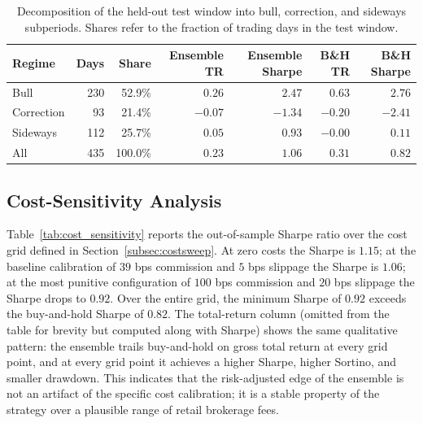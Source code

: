 \documentclass{ieeeaccess}
\newcommand{\BHsharpe}{\ensuremath{0.82}}
\newcommand{\CostZeroSharpe}{\ensuremath{1.15}}
\newcommand{\CostBaseSharpe}{\ensuremath{1.06}}
\newcommand{\CostWorstSharpe}{\ensuremath{0.92}}
\newcommand{\CostMinSharpe}{\ensuremath{0.92}}
\begin{document}
\begin{table}[t]
\centering
\caption{Decomposition of the held-out test window into bull, correction, and sideways subperiods. Shares refer to the fraction of trading days in the test window.}
\label{tab:regime}
\begin{tabular}{lrrrrrr}
\toprule
Regime & Days & Share & Ensemble TR & Ensemble Sharpe & B\&H TR & B\&H Sharpe \\
\midrule
Bull & 230 & 52.9\% & $0.26$ & $2.47$ & $0.63$ & $2.76$ \\
Correction & 93 & 21.4\% & $-0.07$ & $-1.34$ & $-0.20$ & $-2.41$ \\
Sideways & 112 & 25.7\% & $0.05$ & $0.93$ & $-0.00$ & $0.11$ \\
All & 435 & 100.0\% & $0.23$ & $1.06$ & $0.31$ & $0.82$ \\
\bottomrule
\end{tabular}
\end{table}

\subsection{Cost-Sensitivity Analysis}
\label{subsec:cost_sensitivity}

Table~\ref{tab:cost_sensitivity} reports the out-of-sample Sharpe ratio over the cost grid defined in Section~\ref{subsec:costsweep}. At zero costs the Sharpe is \CostZeroSharpe{}; at the baseline calibration of $39$ bps commission and $5$ bps slippage the Sharpe is \CostBaseSharpe{}; at the most punitive configuration of $100$ bps commission and $20$ bps slippage the Sharpe drops to \CostWorstSharpe{}. Over the entire grid, the minimum Sharpe of \CostMinSharpe{} exceeds the buy-and-hold Sharpe of \BHsharpe{}. The total-return column (omitted from the table for brevity but computed along with Sharpe) shows the same qualitative pattern: the ensemble trails buy-and-hold on gross total return at every grid point, and at every grid point it achieves a higher Sharpe, higher Sortino, and smaller drawdown. This indicates that the risk-adjusted edge of the ensemble is not an artifact of the specific cost calibration; it is a stable property of the strategy over a plausible range of retail brokerage fees.
\end{document}
